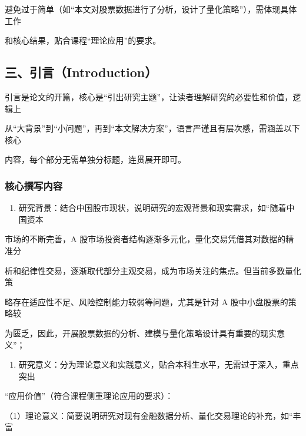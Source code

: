 \documentclass[
]{article}
\providecommand{\tightlist}{%
  \setlength{\itemsep}{0pt}\setlength{\parskip}{0pt}}
\begin{document}
避免过于简单（如``本文对股票数据进行了分析，设计了量化策略''），需体现具体工作

和核心结果，贴合课程``理论应用''的要求。

\hypertarget{ux4e09ux5f15ux8a00introduction}{%
\subsection{\texorpdfstring{\textbf{三、引言（Introduction）}}{三、引言（Introduction）}}\label{ux4e09ux5f15ux8a00introduction}}

引言是论文的开篇，核心是``引出研究主题''，让读者理解研究的必要性和价值，逻辑上

从``大背景''到``小问题''，再到``本文解决方案''，语言严谨且有层次感，需涵盖以下核心

内容，每个部分无需单独分标题，连贯展开即可。

\hypertarget{ux6838ux5fc3ux64b0ux5199ux5185ux5bb9}{%
\subsubsection{\texorpdfstring{\textbf{核心撰写内容}}{核心撰写内容}}\label{ux6838ux5fc3ux64b0ux5199ux5185ux5bb9}}

\begin{enumerate}
\def\labelenumi{\arabic{enumi}.}
\tightlist
\item
  研究背景：结合中国股市现状，说明研究的宏观背景和现实需求，如``随着中国资本
\end{enumerate}

市场的不断完善，A
股市场投资者结构逐渐多元化，量化交易凭借其对数据的精准分

析和纪律性交易，逐渐取代部分主观交易，成为市场关注的焦点。但当前多数量化策

略存在适应性不足、风险控制能力较弱等问题，尤其是针对 A
股中小盘股票的策略较

为匮乏，因此，开展股票数据的分析、建模与量化策略设计具有重要的现实意义''；

\begin{enumerate}
\def\labelenumi{\arabic{enumi}.}
\setcounter{enumi}{1}
\tightlist
\item
  研究意义：分为理论意义和实践意义，贴合本科生水平，无需过于深入，重点突出
\end{enumerate}

``应用价值''（符合课程侧重理论应用的要求）：

（1）理论意义：简要说明研究对现有金融数据分析、量化交易理论的补充，如``丰富
\end{document}
